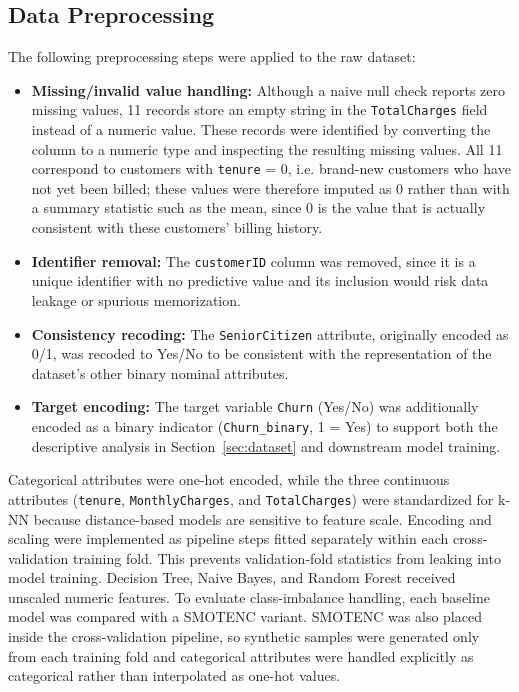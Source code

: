 \documentclass[conference]{IEEEtran}
\begin{document}
	\subsection{Data Preprocessing}
	The following preprocessing steps were applied to the raw dataset:
	\begin{itemize}
		\item \textbf{Missing/invalid value handling:} Although a naive null check reports zero missing values, 11 records store an empty string in the \texttt{TotalCharges} field instead of a numeric value. These records were identified by converting the column to a numeric type and inspecting the resulting missing values. All 11 correspond to customers with \texttt{tenure} = 0, i.e. brand-new customers who have not yet been billed; these values were therefore imputed as 0 rather than with a summary statistic such as the mean, since 0 is the value that is actually consistent with these customers' billing history.
		\item \textbf{Identifier removal:} The \texttt{customerID} column was removed, since it is a unique identifier with no predictive value and its inclusion would risk data leakage or spurious memorization.
		\item \textbf{Consistency recoding:} The \texttt{SeniorCitizen} attribute, originally encoded as 0/1, was recoded to Yes/No to be consistent with the representation of the dataset's other binary nominal attributes.
		\item \textbf{Target encoding:} The target variable \texttt{Churn} (Yes/No) was additionally encoded as a binary indicator (\texttt{Churn\_binary}, 1 = Yes) to support both the descriptive analysis in Section~\ref{sec:dataset} and downstream model training.
	\end{itemize}
	Categorical attributes were one-hot encoded, while the three continuous attributes (\texttt{tenure}, \texttt{MonthlyCharges}, and \texttt{TotalCharges}) were standardized for k-NN because distance-based models are sensitive to feature scale. Encoding and scaling were implemented as pipeline steps fitted separately within each cross-validation training fold. This prevents validation-fold statistics from leaking into model training. Decision Tree, Naive Bayes, and Random Forest received unscaled numeric features. To evaluate class-imbalance handling, each baseline model was compared with a SMOTENC variant. SMOTENC was also placed inside the cross-validation pipeline, so synthetic samples were generated only from each training fold and categorical attributes were handled explicitly as categorical rather than interpolated as one-hot values.
	
\end{document}
